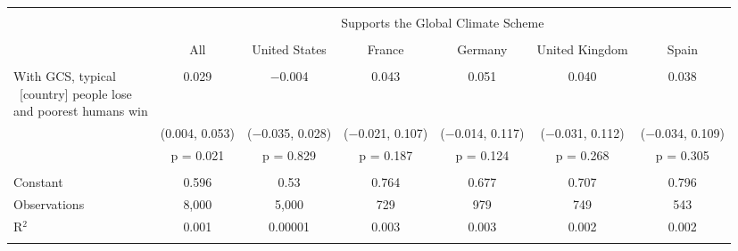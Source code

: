 
\begin{tabular}{@{\extracolsep{5pt}}lcccccc} 
\\[-1.8ex]\hline 
\hline \\[-1.8ex] 
 & \multicolumn{6}{c}{Supports the Global Climate Scheme} \\ 
\cline{2-7} 
\\[-1.8ex] & All & United States & France & Germany & United Kingdom & Spain \\ 
\hline \\[-1.8ex] 
 \makecell{With GCS, typical\\~[country] people lose\\and poorest humans win} & 0.029 & $-$0.004 & 0.043 & 0.051 & 0.040 & 0.038 \\ 
  & (0.004, 0.053) & ($-$0.035, 0.028) & ($-$0.021, 0.107) & ($-$0.014, 0.117) & ($-$0.031, 0.112) & ($-$0.034, 0.109) \\ 
  & p = 0.021 & p = 0.829 & p = 0.187 & p = 0.124 & p = 0.268 & p = 0.305 \\ 
 \hline \\[-1.8ex] 
Constant & 0.596 & 0.53 & 0.764 & 0.677 & 0.707 & 0.796 \\ 
Observations & 8,000 & 5,000 & 729 & 979 & 749 & 543 \\ 
R$^{2}$ & 0.001 & 0.00001 & 0.003 & 0.003 & 0.002 & 0.002 \\ 
\hline 
\hline \\[-1.8ex] 
\end{tabular} 